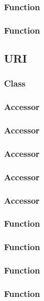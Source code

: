 \subsubsection{Function }
\subsubsection{Function }
\newpage
\subsection{URI}\label{sec:lib uri}
\subsubsection{Class }
\subsubsection{Accessor }
\subsubsection{Accessor }
\subsubsection{Accessor }
\subsubsection{Accessor }
\subsubsection{Accessor }
\subsubsection{Function }
\subsubsection{Function }
\subsubsection{Function }
\subsubsection{Function }
